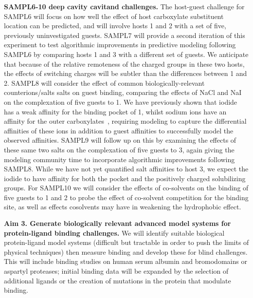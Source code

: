 \documentclass[11pt]{article}
\begin{document}
{\bf SAMPL6-10 deep cavity cavitand challenges.} 
The host-guest challenge for SAMPL6 will focus on how well the effect of host carboxylate substituent location can be predicted, and will involve hosts 1 and 2 with a set of five, previously uninvestigated guests.  
SAMPL7 will provide a second iteration of this experiment to test algorithmic improvements in predictive modeling following SAMPL6 by comparing hosts 1 and 3 with a different set of guests.  
We anticipate that because of the relative remoteness of the charged groups in these two hosts, the effects of switching charges will be subtler than the differences between 1 and 2.  
SAMPL8 will consider the effect of common biologically-relevant counterions/salts salts on guest binding, comparing the effects of NaCl and NaI on the complexation of five guests to 1.  
We have previously shown that iodide has a weak affinity for the binding pocket of 1, whilst sodium ions have an affinity for the outer carboxylates~\cite{carnegie_anion_2014}, requiring modeling to capture the differential affinities of these ions in addition to guest affinities to successfully model the observed affinities.  
SAMPL9 will follow up on this by examining the effects of these same two salts on the complexation of five guests to 3, again giving the modeling community time to incorporate algorithmic improvements following SAMPL8. 
While we have not yet quantified salt affinities to host 3, we expect the iodide to have affinity for both the pocket and the positively charged solubilizing groups.  
For SAMPL10 we will consider the effects of co-solvents on the binding of five guests to 1 and 2 to probe the effect of co-solvent competition for the binding site, as well as effects cosolvents may have in weakening the hydrophobic effect. 


{\bf Aim 3. Generate biologically relevant advanced model systems for protein-ligand binding challenges.}
We will identify suitable biological protein-ligand model systems (difficult but tractable in order to push the limits of physical techniques) then measure binding and develop these for blind challenges. This will include binding studies on human serum albumin and bromodomains or aspartyl proteases; initial binding data will be expanded by the selection of additional ligands or the creation of mutations in the protein that modulate binding.
\end{document}
